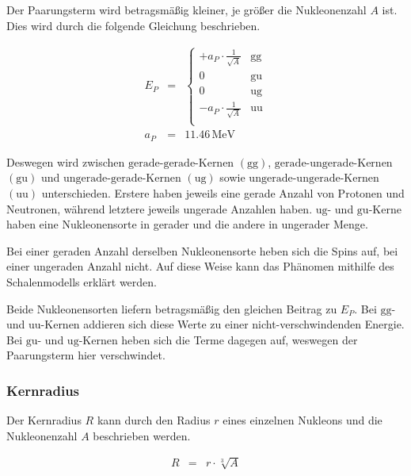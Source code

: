 \documentclass[12pt,a4paper]{scrartcl}
\numberwithin{equation}{section} %
\renewcommand{\[}{} %
\renewcommand{\]}{\noindent} %
\begin{document}
Der Paarungsterm wird betragsmäßig kleiner, je größer die Nukleonenzahl
$A$ ist. Dies wird durch die folgende Gleichung beschrieben.

\[
\begin{eqnarray}
        E_P &=&
                \begin{cases}
                        + a_P\cdot \frac{1}{\sqrt{A}} & \text{gg} \\
                        0 & \text{gu} \\
                        0 & \text{ug} \\
                        - a_P\cdot \frac{1}{\sqrt{A}} & \text{uu} \\
                \end{cases} \\
        a_P &=& 11.46\mathrm{\,MeV}
\end{eqnarray}
\]

Deswegen wird zwischen $\mathrm{gerade}$-$\mathrm{gerade}$-Kernen
$(\mathrm{gg})$, $\mathrm{gerade}$-$\mathrm{ungerade}$-Kernen
$(\mathrm{gu})$ und $\mathrm{ungerade}$-$\mathrm{gerade}$-Kernen
$(\mathrm{ug})$ sowie
$\mathrm{ungerade}$-$\mathrm{ungerade}$-Kernen $(\mathrm{uu})$
unterschieden. Erstere haben jeweils eine gerade Anzahl von Protonen und
Neutronen, während letztere jeweils ungerade Anzahlen haben.
$\mathrm{ug}$- und $\mathrm{gu}$-Kerne haben eine Nukleonensorte in
gerader und die andere in ungerader Menge.

Bei einer geraden Anzahl derselben Nukleonensorte heben sich die Spins
auf, bei einer ungeraden Anzahl nicht. Auf diese Weise kann das Phänomen
mithilfe des Schalenmodells erklärt werden.

Beide Nukleonensorten liefern betragsmäßig den gleichen Beitrag zu
$E_P$. Bei $\mathrm{gg}$- und $\mathrm{uu}$-Kernen addieren sich
diese Werte zu einer nicht-verschwindenden Energie. Bei $\mathrm{gu}$-
und $\mathrm{ug}$-Kernen heben sich die Terme dagegen auf, weswegen
der Paarungsterm hier verschwindet.

\hypertarget{kernradius}{%
\subsubsection{Kernradius}\label{kernradius}}

Der Kernradius $R$ kann durch den Radius $r$ eines einzelnen
Nukleons und die Nukleonenzahl $A$ beschrieben werden.

\[
\begin{eqnarray}
        R &=& r \cdot \sqrt[3]{A}
\end{eqnarray}
\]
\end{document}
